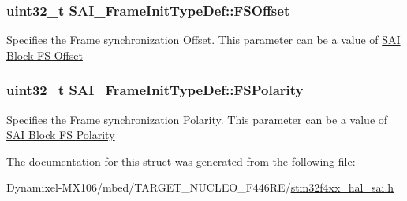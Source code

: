 \subsubsection[{\texorpdfstring{F\+S\+Offset}{FSOffset}}]{\setlength{\rightskip}{0pt plus 5cm}uint32\+\_\+t S\+A\+I\+\_\+\+Frame\+Init\+Type\+Def\+::\+F\+S\+Offset}\hypertarget{struct_s_a_i___frame_init_type_def_ab226d4d8ac8167cf9a4b12786ac18c2b}{}\label{struct_s_a_i___frame_init_type_def_ab226d4d8ac8167cf9a4b12786ac18c2b}
Specifies the Frame synchronization Offset. This parameter can be a value of \hyperlink{group___s_a_i___block___f_s___offset}{S\+AI Block FS Offset} 
\subsubsection[{\texorpdfstring{F\+S\+Polarity}{FSPolarity}}]{\setlength{\rightskip}{0pt plus 5cm}uint32\+\_\+t S\+A\+I\+\_\+\+Frame\+Init\+Type\+Def\+::\+F\+S\+Polarity}\hypertarget{struct_s_a_i___frame_init_type_def_a5afca722951634a6e86a4453a0899cc5}{}\label{struct_s_a_i___frame_init_type_def_a5afca722951634a6e86a4453a0899cc5}
Specifies the Frame synchronization Polarity. This parameter can be a value of \hyperlink{group___s_a_i___block___f_s___polarity}{S\+AI Block FS Polarity} 

The documentation for this struct was generated from the following file\+:\begin{DoxyCompactItemize}
\item 
Dynamixel-\/\+M\+X106/mbed/\+T\+A\+R\+G\+E\+T\+\_\+\+N\+U\+C\+L\+E\+O\+\_\+\+F446\+R\+E/\hyperlink{stm32f4xx__hal__sai_8h}{stm32f4xx\+\_\+hal\+\_\+sai.\+h}\end{DoxyCompactItemize}
